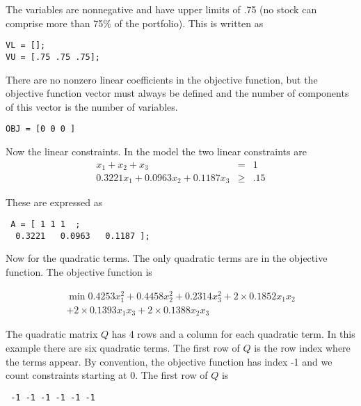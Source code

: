 \documentclass[11pt]{article}
\renewcommand{\_}{{\char"5F}}
\renewcommand{\{}{{\char"7B}}
\renewcommand{\}}{{\char"7D}}
\renewcommand{\^}{{\char"0D}}
\renewcommand{\'}{{\char"0D}}
\begin{document}
The variables are nonnegative and have upper limits of .75 (no stock can comprise more than 75\% of the portfolio).  This is written as




\begin{verbatim}
VL = [];
VU = [.75 .75 .75];
\end{verbatim}



There are no nonzero linear coefficients in the objective function, but the objective function vector must always be defined and the number of components of this vector is the number of variables.



\begin{verbatim}
OBJ = [0 0 0 ]
\end{verbatim}


 Now the linear constraints.   In the model the two linear constraints are
 \begin{eqnarray*}
 x_{1} + x_{2} + x_{3} &=& 1 \\
 0.3221 x_{1} +   0.0963x_{2} +    0.1187x_{3}  &\ge& .15 
 \end{eqnarray*}



 These are expressed as



 \begin{verbatim}
 A = [ 1 1 1  ;
  0.3221   0.0963   0.1187 ];
 \end{verbatim}


Now for the quadratic terms. The only quadratic terms are in the objective function. The objective function is


\begin{eqnarray*}
\min  0.4253 x_{1}^{2} +  0.4458 x_{2}^{2} + 0.2314 x_{3}^{2} + 2 \times 0.1852 x_{1} x_{2} \\ + 2 \times 0.1393 x_{1} x_{3} + 2 \times
 0.1388 x_{2} x_{3}
\end{eqnarray*}


 The quadratic matrix $Q$ has 4 rows and a column for each quadratic term. In this example there are six quadratic terms.  The first row of $Q$ is the row index where the terms appear. By convention, the objective function has index -1 and we count constraints starting at 0.  The first row of $Q$ is


 \begin{verbatim}
 -1 -1 -1 -1 -1 -1
 \end{verbatim}
\end{document}
